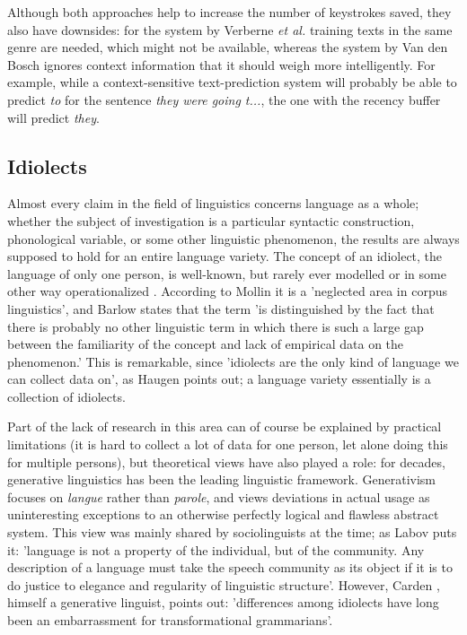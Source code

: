 \documentclass[11pt]{article}
\begin{document}
Although both approaches help to increase the number of keystrokes saved, they also have downsides: for the system by Verberne {\em et al.}  training texts in the same genre are needed, which might not be available, whereas the system by Van den Bosch  ignores context information that it should weigh more intelligently. For example, while a context-sensitive text-prediction system will probably be able to predict \emph{to} for the sentence \emph{they were going t...}, the one with the recency buffer will predict \emph{they}.


\subsection{Idiolects} \label{idiolects}

Almost every claim in the field of linguistics concerns language as a whole; whether the subject of investigation is a particular syntactic construction, phonological variable, or some other linguistic phenomenon, the results are always supposed to hold for an entire language variety. The concept of an idiolect, the language of only one person, is well-known, but rarely ever modelled or in some other way operationalized \cite{mollin09,barlow10,louwerse04}. According to Mollin  it is a 'neglected area in corpus linguistics', and Barlow  states that the term 'is distinguished by the fact that there is probably no other linguistic term in which there is such a large gap between the familiarity of the concept and lack of empirical data on the phenomenon.' This is remarkable, since 'idiolects are the only kind of language we can collect data on', as Haugen  points out; a language variety essentially is a collection of idiolects.

Part of the lack of research in this area can of course be explained by practical limitations (it is hard to collect a lot of data for one person, let alone doing this for multiple persons), but theoretical views have also played a role: for decades, generative linguistics has been the leading linguistic framework. Generativism focuses on \emph{langue} rather than \emph{parole}, and views deviations in actual usage as uninteresting exceptions to an otherwise perfectly logical and flawless abstract system. This view was mainly shared by sociolinguists at the time; as Labov  puts it: 'language is not a property of the individual, but of the community. Any description of a language must take the speech community as its object if it is to do justice to elegance and regularity of linguistic structure'. However, Carden , himself a generative linguist, points out: 'differences among idiolects have long been an embarrassment for transformational grammarians'.
\end{document}
